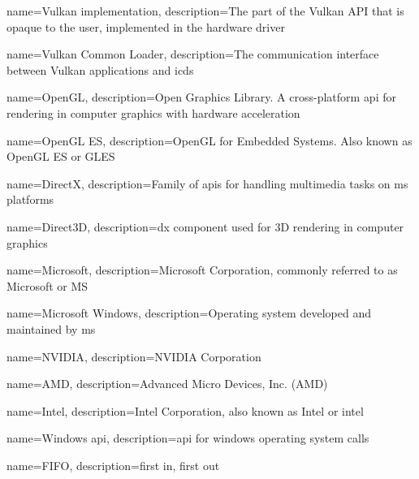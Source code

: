 {
  name={Vulkan implementation},
  description={The part of the Vulkan API that is opaque to the user, implemented in the hardware driver}
}

{
  name={Vulkan Common Loader},
  description={The communication interface between Vulkan applications and \glspl{icd}}
}

{
  name={OpenGL},
  description={Open Graphics Library. A cross-platform \gls{api} for rendering in computer graphics with hardware acceleration}
}

{
  name={OpenGL ES},
  description={OpenGL for Embedded Systems. Also known as OpenGL ES or GLES}
}

{
  name={DirectX},
  description={Family of \glspl{api} for handling multimedia tasks on \acrfull{ms} platforms}
}

{
  name={Direct3D},
  description={\gls{dx} component used for 3D rendering in computer graphics}
}

{
  name={Microsoft},
  description={Microsoft Corporation, commonly referred to as Microsoft or MS}
}

{
  name={Microsoft Windows},
  description={Operating system developed and maintained by \gls{ms}}
}

{
  name={NVIDIA},
  description={NVIDIA Corporation}
}

{
  name={AMD},
  description={Advanced Micro Devices, Inc. (AMD)}
}

{
  name={Intel},
  description={Intel Corporation, also known as Intel or intel}
}

{
  name={Windows \gls{api}},
  description={\gls{api} for \gls{windows} operating system calls}
}

{
  name={FIFO},
  description={first in, first out}
}
